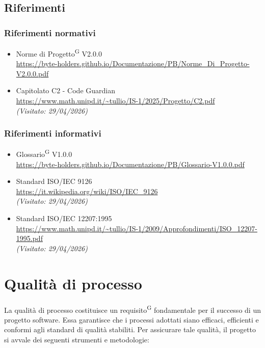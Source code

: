 \documentclass[a4paper, 11pt]{article}
\newcommand{\lastVisited}[3]{\textit{(Visitato: #1/#2/#3)}}
\begin{document}
\subsection{Riferimenti}

\subsubsection{Riferimenti normativi}
\begin{itemize}
    \item
    	Norme di Progetto\textsuperscript{G} V2.0.0\\
    	\url{https://byte-holders.github.io/Documentazione/PB/Norme_Di_Progetto-V2.0.0.pdf}
    \item 
    	Capitolato C2 - Code Guardian\\
    	\url{https://www.math.unipd.it/~tullio/IS-1/2025/Progetto/C2.pdf}\\
    	\lastVisited{29}{04}{2026}
\end{itemize}

\subsubsection{Riferimenti informativi}
\begin{itemize}
    \item 
    	Glossario\textsuperscript{G} V1.0.0\\
    	\url{https://byte-holders.github.io/Documentazione/PB/Glossario-V1.0.0.pdf}
    \item
    	Standard ISO/IEC 9126\\
    	\url{https://it.wikipedia.org/wiki/ISO/IEC_9126}\\
    	\lastVisited{29}{04}{2026}
    \item
    	Standard ISO/IEC 12207:1995\\
    	\url{https://www.math.unipd.it/~tullio/IS-1/2009/Approfondimenti/ISO_12207-1995.pdf}\\
    	\lastVisited{29}{04}{2026}
\end{itemize}


\newpage
\section{Qualità di processo}
La qualità di processo costituisce un requisito\textsuperscript{G} fondamentale per il successo di un progetto software.
Essa garantisce che i processi adottati siano efficaci, efficienti e conformi agli standard di qualità stabiliti.
Per assicurare tale qualità, il progetto si avvale dei seguenti strumenti e metodologie:
\end{document}
